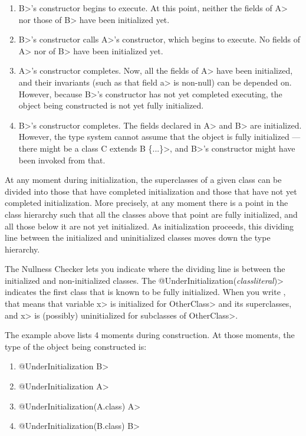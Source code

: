 \begin{enumerate}
\item \<B>'s constructor begins to execute.  At this point, neither the
  fields of \<A> nor those of \<B> have been initialized yet.
\item \<B>'s constructor calls \<A>'s constructor, which begins to execute.
  No fields of \<A> nor of \<B> have been initialized yet.
\item \<A>'s constructor completes.  Now, all the fields of \<A> have been
  initialized, and their invariants (such as that field \<a> is non-null) can be
  depended on.  However, because \<B>'s constructor has not yet completed
  executing, the object being constructed is not yet fully initialized.
\item \<B>'s constructor completes.  The fields declared in \<A> and \<B>
  are initialized.  However, the type system cannot assume that the object
  is fully initialized --- there might be a \<class C extends B \{...\}>,
  and \<B>'s constructor might have been invoked from that.
\end{enumerate}

At any moment during initialization, the superclasses of a given class
can be divided into those that have completed initialization and those that
have not yet completed initialization.  More precisely, at any moment there
is a point in the class hierarchy such that all the classes above that
point are fully initialized, and all those below it are not yet
initialized.  As initialization proceeds, this dividing line between the
initialized and uninitialized classes moves down the type hierarchy.

The Nullness Checker lets you indicate where the dividing line is between
the initialized and non-initialized classes.
The \<@UnderInitialization(\emph{classliteral})>
indicates the first class that is known to be fully initialized.
When you write , that
means that variable \<x> is initialized for \<OtherClass> and its
superclasses, and \<x> is (possibly) uninitialized for subclasses of \<OtherClass>.

The example above lists 4 moments during construction.  At those moments,
the type of the object being constructed is:

\begin{enumerate}
\item
  \<@UnderInitialization B>
\item
  \<@UnderInitialization A>
\item
  \<@UnderInitialization(A.class) A>
\item
  \<@UnderInitialization(B.class) B>
\end{enumerate}

